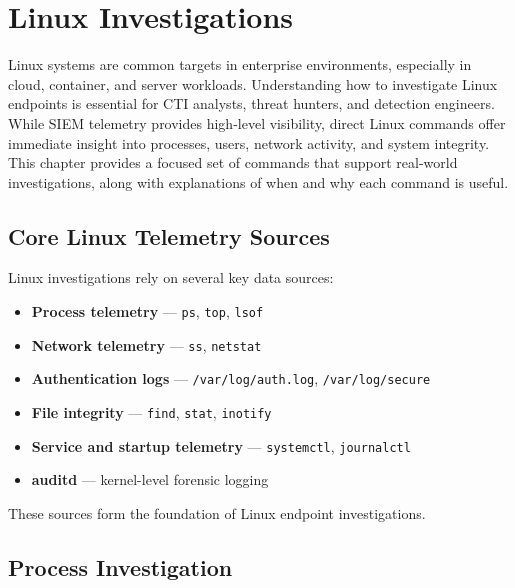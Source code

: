 \section{Linux Investigations}

Linux systems are common targets in enterprise environments, especially in cloud, container, and server workloads. 
Understanding how to investigate Linux endpoints is essential for CTI analysts, threat hunters, and detection engineers. 
While SIEM telemetry provides high-level visibility, direct Linux commands offer immediate insight into processes, users, 
network activity, and system integrity. This chapter provides a focused set of commands that support real-world investigations, 
along with explanations of when and why each command is useful.


\subsection*{Core Linux Telemetry Sources}

Linux investigations rely on several key data sources:

\begin{itemize}
    \item \textbf{Process telemetry} — \texttt{ps}, \texttt{top}, \texttt{lsof}
    \item \textbf{Network telemetry} — \texttt{ss}, \texttt{netstat}
    \item \textbf{Authentication logs} — \texttt{/var/log/auth.log}, \texttt{/var/log/secure}
    \item \textbf{File integrity} — \texttt{find}, \texttt{stat}, \texttt{inotify}
    \item \textbf{Service and startup telemetry} — \texttt{systemctl}, \texttt{journalctl}
    \item \textbf{auditd} — kernel-level forensic logging
\end{itemize}

These sources form the foundation of Linux endpoint investigations.


\subsection*{Process Investigation}

